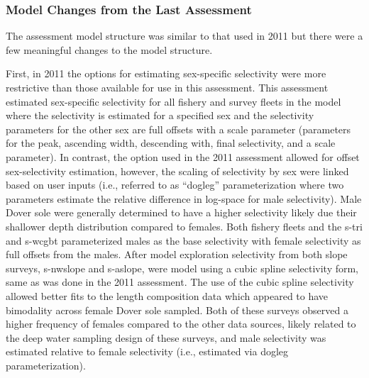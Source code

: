 \documentclass[11pt,
  english,
  a4paper,
]{article}
\begin{document}
\hypertarget{model-changes-from-the-last-assessment}{%
\subsubsection{Model Changes from the Last Assessment}\label{model-changes-from-the-last-assessment}}

\leavevmode\tagmcend\tagstructend


The assessment model structure was similar to that used in 2011 but there were a few meaningful changes to the model structure.

\leavevmode\tagmcend\tagstructend\par


First, in 2011 the options for estimating sex-specific selectivity were more restrictive than those available for use in this assessment. This assessment estimated sex-specific selectivity for all fishery and survey fleets in the model where the selectivity is estimated for a specified sex and the selectivity parameters for the other sex are full offsets with a scale parameter (parameters for the peak, ascending width, descending with, final selectivity, and a scale parameter). In contrast, the option used in the 2011 assessment allowed for offset sex-selectivity estimation, however, the scaling of selectivity by sex were linked based on user inputs (i.e., referred to as ``dogleg'' parameterization where two parameters estimate the relative difference in log-space for male selectivity). Male Dover sole were generally determined to have a higher selectivity likely due their shallower depth distribution compared to females. Both fishery fleets and the \gls{s-tri} and \gls{s-wcgbt} parameterized males as the base selectivity with female selectivity as full offsets from the males. After model exploration selectivity from both slope surveys, \gls{s-nwslope} and \gls{s-aslope}, were model using a cubic spline selectivity form, same as was done in the 2011 assessment. The use of the cubic spline selectivity allowed better fits to the length composition data which appeared to have bimodality across female Dover sole sampled. Both of these surveys observed a higher frequency of females compared to the other data sources, likely related to the deep water sampling design of these surveys, and male selectivity was estimated relative to female selectivity (i.e., estimated via dogleg parameterization).
\end{document}
